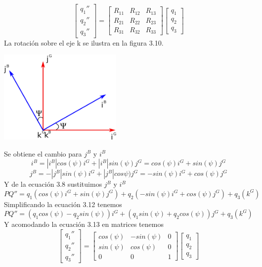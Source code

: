 \begin{equation}
	\begin{bmatrix}
		q_1'' \\
		q_2'' \\
		q_3''
	\end{bmatrix}
	=
	\begin{bmatrix}
		R_{11} & R_{12} & R_{13} \\
		R_{21} & R_{22} & R_{23} \\
		R_{31} & R_{32} & R_{33}
	\end{bmatrix}
	\begin{bmatrix}
		q_1 \\
		q_2 \\
		q_3
	\end{bmatrix}
\end{equation}
La rotación sobre el eje k se ilustra en la figura 3.10.
\begin{center}
	\includegraphics[width=0.45\textwidth]{Contenido/Cuerpo/Capitulo3/Fig15.eps}
	\label{fig:ModeloMat:Fig1}
\end{center}
Se obtiene el cambio para $j^B$ y $i^B$
\begin{equation}
	i^B = |i^B|cos(\psi)i^G + |i^B|sin(\psi)j^G = cos(\psi)i^G + sin(\psi)j^G
\end{equation}
\begin{equation}
	j^B = -|j^B|sin(\psi)i^G + |j^B|cos\psi)j^G = -sin(\psi)i^G + cos(\psi)j^G
\end{equation}
Y de la ecuación 3.8 sustituimos $j^B$ y $i^B$
\begin{equation}
	PQ'' = q_1(cos(\psi)i^G + sin(\psi)j^G) + q_2(-sin(\psi)i^G + cos(\psi)j^G) + q_3(k^G)
\end{equation}
Simplificando la ecuación 3.12 tenemos
\begin{equation}
	PQ''= (q_1cos(\psi) - q_2sin(\psi))i^G + (q_1sin(\psi) + q_2cos(\psi))j^G + q_3(k^G)
\end{equation}
Y acomodando la ecuación 3.13 en matrices tenemos
\begin{equation}
	\begin{bmatrix}
		q_1'' \\
		q_2'' \\
		q_3''
	\end{bmatrix}
	=
	\begin{bmatrix}
		cos(\psi) & -sin(\psi) & 0 \\
		sin(\psi) & cos(\psi)  & 0 \\
		0         & 0          & 1
	\end{bmatrix}
	\begin{bmatrix}
		q_1 \\
		q_2 \\
		q_3
	\end{bmatrix}
\end{equation}
